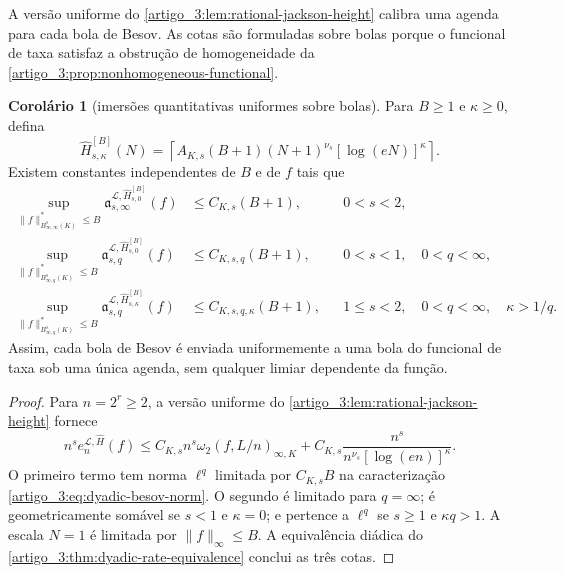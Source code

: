 \documentclass[12pt,a4paper]{article}
\theoremstyle{preciso}
\theoremstyle{definition}
\newcommand{\Library}{\mathcal{L}}
\theoremstyle{preciso}
\theoremstyle{preciso}
\theoremstyle{preciso}
\theoremstyle{preciso}
\newtheorem{corollary}[teorema]{Corolário}
\theoremstyle{definition}
\theoremstyle{preciso}
\theoremstyle{definition}
\theoremstyle{preciso}
\theoremstyle{preciso}
\theoremstyle{definition}
\begin{document}
A versão uniforme do \cref{artigo_3:lem:rational-jackson-height} calibra uma agenda para cada bola de Besov. As cotas são formuladas sobre bolas porque o funcional de taxa satisfaz a obstrução de homogeneidade da \cref{artigo_3:prop:nonhomogeneous-functional}.

\begin{corollary}[imersões quantitativas uniformes sobre bolas]\label{map:artigo_3:4.3}
\label{artigo_3:cor:uniform-besov-ball-embedding}
Para $B\ge1$ e $\kappa\ge0$, defina
\begin{equation}
 \widehat H_{s,\kappa}^{[B]}(N)
 =\left\lceil A_{K,s}(B+1)(N+1)^{\nu_s}
        [\log(eN)]^\kappa\right\rceil .
 \label{artigo_3:eq:ball-calibrated-height-schedule}
\end{equation}
Existem constantes independentes de $B$ e de $f$ tais que
\begin{align}
 \sup_{\|f\|_{B^s_{\infty,\infty}(K)}^*\le B}
 \mathfrak a_{s,\infty}^{\Library,
       \widehat H_{s,0}^{[B]}}(f)
 &\le C_{K,s}(B+1), &&0<s<2,\label{artigo_3:eq:uniform-ball-endpoint}\\
 \sup_{\|f\|_{B^s_{\infty,q}(K)}^*\le B}
 \mathfrak a_{s,q}^{\Library,
       \widehat H_{s,0}^{[B]}}(f)
 &\le C_{K,s,q}(B+1), &&0<s<1,\quad0<q<\infty,
 \label{artigo_3:eq:uniform-ball-subcritical}\\
 \sup_{\|f\|_{B^s_{\infty,q}(K)}^*\le B}
 \mathfrak a_{s,q}^{\Library,
       \widehat H_{s,\kappa}^{[B]}}(f)
 &\le C_{K,s,q,\kappa}(B+1),
 &&1\le s<2,\quad0<q<\infty,\quad\kappa>1/q.
 \label{artigo_3:eq:uniform-ball-critical}
\end{align}
Assim, cada bola de Besov é enviada uniformemente a uma bola do funcional de
taxa sob uma única agenda, sem qualquer limiar dependente da função.
\end{corollary}

\begin{proof}
Para $n=2^r\ge2$, a versão uniforme do
\cref{artigo_3:lem:rational-jackson-height} fornece
\[
 n^s e_n^{\Library,\widehat H}(f)
 \le C_{K,s}n^s\omega_2(f,L/n)_{\infty,K}
 +C_{K,s}\frac{n^s}{n^{\nu_s}[\log(en)]^\kappa}.
\]
O primeiro termo tem norma $\ell^q$ limitada por $C_{K,s}B$ na
caracterização \eqref{artigo_3:eq:dyadic-besov-norm}. O segundo é limitado para
$q=\infty$; é geometricamente somável se $s<1$ e $\kappa=0$; e pertence a
$\ell^q$ se $s\ge1$ e $\kappa q>1$. A escala $N=1$ é limitada por
$\|f\|_\infty\le B$. A equivalência diádica do
\cref{artigo_3:thm:dyadic-rate-equivalence} conclui as três cotas.
\end{proof}
\end{document}
